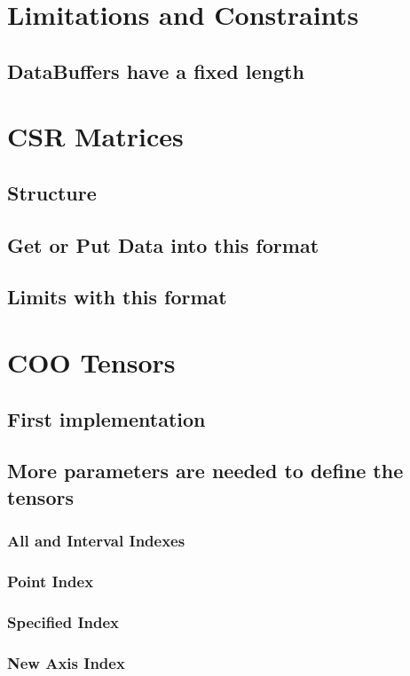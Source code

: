 \section{Limitations and Constraints}
\subsection{DataBuffers have a fixed length}


\section{CSR Matrices}
\subsection{Structure}
\subsection{Get or Put Data into this format}
\subsection{Limits with this format}

\section{COO Tensors}
\subsection{First implementation}

\subsection{More parameters are needed to define the tensors}
\subsubsection{All and Interval Indexes}
\subsubsection{Point Index}
\subsubsection{Specified Index}
\subsubsection{New Axis Index}

